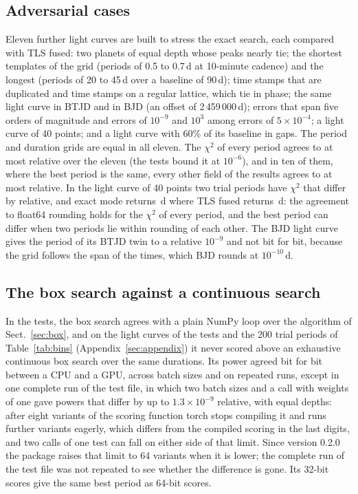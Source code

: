 \documentclass{aastex631}
\begin{document}
\subsection{Adversarial cases}\label{sec:adversarial}
Eleven further light curves are built to stress the exact search, each compared with TLS fused: two planets of equal depth whose peaks nearly tie; the shortest templates of the grid (periods of 0.5 to 0.7\,d at 10-minute cadence) and the longest (periods of 20 to 45\,d over a baseline of 90\,d); time stamps that are duplicated and time stamps on a regular lattice, which tie in phase; the same light curve in BTJD and in BJD (an offset of 2\,459\,000\,d); errors that span five orders of magnitude and errors of $10^{-9}$ and $10^{3}$ among errors of $5\times10^{-4}$; a light curve of 40 points; and a light curve with 60\% of its baseline in gaps. The period and duration grids are equal in all eleven. The $\chi^2$ of every period agrees to at most  relative over the eleven (the tests bound it at $10^{-6}$), and in ten of them, where the best period is the same, every other field of the results agrees to at most  relative. In the light curve of 40 points two trial periods have $\chi^2$ that differ by  relative, and exact mode returns \,d where TLS fused returns \,d: the agreement to float64 rounding holds for the $\chi^2$ of every period, and the best period can differ when two periods lie within rounding of each other. The BJD light curve gives the period of its BTJD twin to a relative $10^{-9}$ and not bit for bit, because the grid follows the span of the times, which BJD rounds at $10^{-10}$\,d.

\subsection{The box search against a continuous search}\label{sec:boxcheck}
In the tests, the box search agrees with a plain NumPy loop over the algorithm of Sect.~\ref{sec:box}, and on the light curves of the tests and the 200 trial periods of Table~\ref{tab:bins} (Appendix~\ref{sec:appendix}) it never scored above an exhaustive continuous box search over the same durations. Its power agreed bit for bit between a CPU and a GPU, across batch sizes and on repeated runs, except in one complete run of the test file, in which two batch sizes and a call with weights of one gave powers that differ by up to $1.3\times10^{-9}$ relative, with equal depths: after eight variants of the scoring function torch stops compiling it and runs further variants eagerly, which differs from the compiled scoring in the last digits, and two calls of one test can fall on either side of that limit. Since version 0.2.0 the package raises that limit to 64 variants when it is lower; the complete run of the test file was not repeated to see whether the difference is gone. Its 32-bit scores give the same best period as 64-bit scores.
\end{document}
